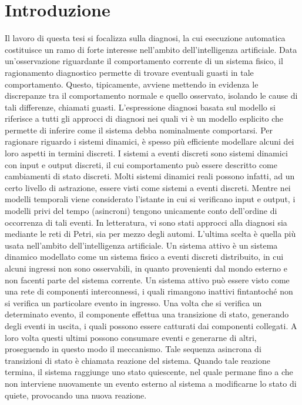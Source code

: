 \chapter{Introduzione}
Il lavoro di questa tesi si focalizza sulla diagnosi, la cui esecuzione automatica costituisce un ramo di forte interesse nell'ambito dell'intelligenza artificiale. Data un'osservazione riguardante il comportamento corrente di un sistema fisico, il ragionamento diagnostico permette di trovare eventuali guasti in tale comportamento. Questo, tipicamente, avviene mettendo in evidenza le discrepanze tra il comportamento normale e quello osservato, isolando le cause di tali differenze, chiamati guasti. L'espressione diagnosi basata sul modello si riferisce a tutti gli approcci di diagnosi nei quali vi è un modello esplicito che permette di inferire come il sistema debba nominalmente comportarsi. 
Per ragionare riguardo i sistemi dinamici, è spesso più efficiente modellare alcuni dei loro aspetti in termini discreti. I sistemi a eventi discreti sono sistemi dinamici con input e output discreti, il cui comportamento può essere descritto come cambiamenti di stato discreti. Molti sistemi dinamici reali possono infatti, ad un certo livello di astrazione, essere visti come sistemi a eventi discreti. Mentre nei modelli temporali viene considerato l'istante in cui si verificano input e output, i modelli privi del tempo (asincroni) tengono unicamente conto dell'ordine di occorrenza di tali eventi. 
In letteratura, vi sono stati approcci alla diagnosi sia mediante le reti di Petri, sia per mezzo degli automi. L'ultima scelta è quella più usata nell'ambito dell'intelligenza artificiale.
Un sistema attivo è un sistema dinamico modellato come un sistema fisico a eventi discreti distribuito, in cui alcuni ingressi non sono osservabili, in quanto provenienti dal mondo esterno e non facenti parte del sistema corrente. Un sistema attivo può essere visto come una rete di componenti interconnessi, i quali rimangono inattivi fintantoché non si verifica un particolare evento in ingresso. Una volta che si verifica un determinato evento, il componente effettua una transizione di stato, generando degli eventi in uscita, i quali possono essere catturati dai componenti collegati. A loro volta questi ultimi possono consumare eventi e generarne di altri, proseguendo in questo modo il meccanismo. Tale sequenza asincrona di transizioni di stato è chiamata reazione del sistema. Quando tale reazione termina, il sistema raggiunge uno stato quiescente, nel quale permane fino a che non interviene nuovamente un evento esterno al sistema a modificarne lo stato di quiete, provocando una nuova reazione. 
